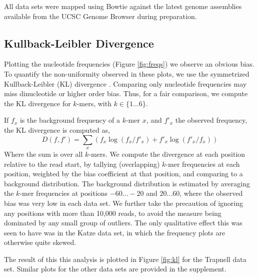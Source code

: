 \documentclass{bioinfo}
\begin{document}
All data sets were mapped using Bowtie \cite{Langmead2009} against the latest
genome assemblies available from the UCSC Genome Browser \cite{Rhead2010} during
preparation.



\subsection{Kullback-Leibler Divergence}

Plotting the nucleotide frequencies (Figure  \ref{fig:freqs}) we observe an
obvious bias. To quantify the non-uniformity observed in these plots, we use the
symmetrized Kullback-Leibler (KL) divergence \cite{Kullback1951}. Comparing only
nucleotide frequencies may miss dinucleotide or higher order bias. Thus, for a fair
comparison, we compute the KL divergence for $k$-mers, with $k \in \{ 1 \dots 6
\}$.

If $f_x$ is the background frequency of a $k$-mer $x$, and $f'_x$ the observed
frequency, the KL divergence is computed as,
$$D( f, f' ) = \sum_{x} \left( f_x \log( f_x / f'_x ) + f'_x \log( f'_x / f_x) \right)$$
Where the sum is over all $k$-mers. We compute the divergence at each
position relative to the read start, by tallying (overlapping) $k$-mer
frequencies at each position, weighted by the bias coefficient at that position,
and comparing to a background distribution. The background distribution is
estimated by averaging the $k$-mer frequencies at positions $-60 \dots -20$ and
$20 \dots 60$, where the observed bias was very low in each data set.  We further
take the precaution of ignoring any positions with more than 10,000 reads, to
avoid the measure being dominated by any small group of outliers. The only
qualitative effect this was seen to have was in the Katze data set, in which the
frequency plots are otherwise quite skewed.

The result of this this analysis is plotted in Figure
\ref{fig:kl} for the Trapnell data set. Similar plots for the other data sets are
provided in the supplement.

\begin{comment}
\begin{figurehere}
\begin{center}
\texttt{[image: fig/kl.pdf]}
\end{center}
\caption{Plots of the KL divergence over overlapping $k$-mers in the Trapnell
experiment.}
\label{fig:kl}
\end{figurehere}
\end{comment}
\end{document}
